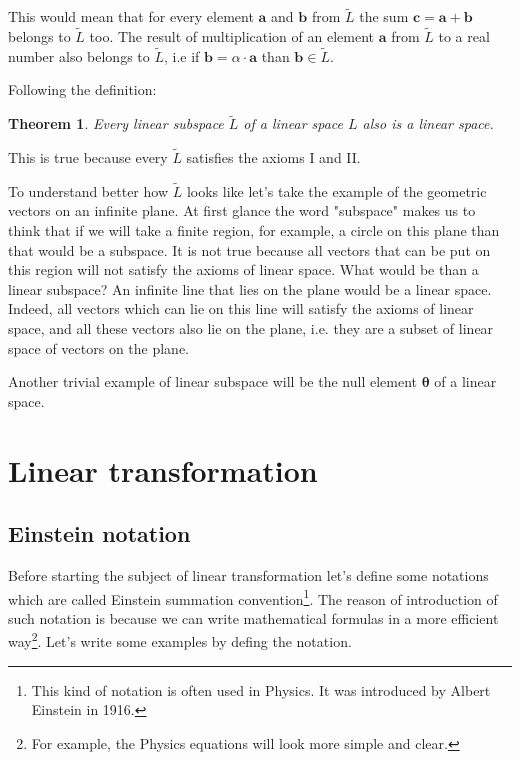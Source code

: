 \documentclass{book}
\newtheorem{theorem}{Theorem}
\begin{document}
This would mean that for every element $\boldsymbol{a}$ and $\boldsymbol{b}$ from $\widetilde{L}$ the sum $\boldsymbol{c} = \boldsymbol{a} + \boldsymbol{b}$ belongs to $\widetilde{L}$ too. The result of multiplication of an element $\boldsymbol{a}$ from $\widetilde{L}$ to a real number also belongs to $\widetilde{L}$, i.e if $\boldsymbol{b} = \alpha\cdot\boldsymbol{a}$ than $\boldsymbol{b} \in \widetilde{L}$.

Following the definition:

\begin{theorem}
Every linear subspace $\widetilde{L}$ of a linear space $L$ also is a linear space.
\end{theorem}

This is true because every $\widetilde{L}$ satisfies the axioms I and II.

To understand better how $\widetilde{L}$ looks like let's take the example of the geometric vectors on an infinite plane. At first glance the word "subspace" makes us to think that if we will take a finite region, for example, a circle on this plane than that would be a subspace. It is not true because all vectors that can be put on this region will not satisfy the axioms of linear space. What would be than a linear subspace? An infinite line that lies on the plane would be a linear space. Indeed, all vectors which can lie on this line will satisfy the axioms of linear space, and all these vectors also lie on the plane, i.e. they are a subset of linear space of vectors on the plane.

Another trivial example of linear subspace will be the null element $\boldsymbol{\theta}$ of a linear space.

\section{Linear transformation}

\subsection{Einstein notation}

Before starting the subject of linear transformation let's define some notations which are called Einstein summation convention\footnote{This kind of notation is often used in Physics. It was introduced by Albert Einstein in 1916.}. The reason of introduction of such notation is because we can write mathematical formulas in a more efficient way\footnote{For example, the Physics equations will look more simple and clear.}. Let's write some examples by defing the notation.
\end{document}
